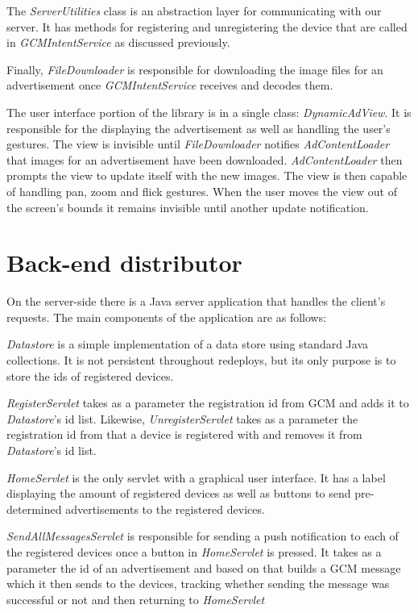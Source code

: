 The \textit{ServerUtilities} class is an abstraction layer for communicating with our server. It has methods for registering and unregistering the device that are called in \textit{GCMIntentService} as discussed previously.

Finally, \textit{FileDownloader} is responsible for downloading the image files for an advertisement once \textit{GCMIntentService} receives and decodes them.

The user interface portion of the library is in a single class: \textit{DynamicAdView}. It is responsible for the displaying the advertisement as well as handling the user's gestures. The view is invisible until \textit{FileDownloader} notifies \textit{AdContentLoader} that images for an advertisement have been downloaded. \textit{AdContentLoader} then prompts the view to update itself with the new images. The view is then capable of handling pan, zoom and flick gestures. When the user moves the view out of the screen's bounds it remains invisible until another update notification.

\section{Back-end distributor}

On the server-side there is a Java server application that handles the client's requests. The main components of the application are as follows:

\textit{Datastore} is a simple implementation of a data store using standard Java collections. It is not persistent throughout redeploys, but its only purpose is to store the ids of registered devices.

\textit{RegisterServlet} takes as a parameter the registration id from GCM and adds it to \textit{Datastore}'s id list. Likewise, \textit{UnregisterServlet} takes as a parameter the registration id from that a device is registered with and removes it from \textit{Datastore}'s id list.

\textit{HomeServlet} is the only servlet with a graphical user interface. It has a label displaying the amount of registered devices as well as buttons to send pre-determined advertisements to the registered devices.

\textit{SendAllMessagesServlet} is responsible for sending a push notification to each of the registered devices once a button in \textit{HomeServlet} is pressed. It takes as a parameter the id of an advertisement and based on that builds a GCM message which it then sends to the devices, tracking whether sending the message was successful or not and then returning to \textit{HomeServlet}

